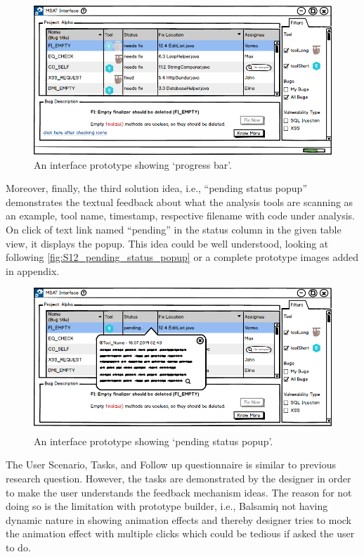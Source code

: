 \begin{figure}[hbt!]
	\centering
	\includegraphics[width=\linewidth]{figures/solution_ideas_snaps/S12_disabled_icons_progress_bar}
	\caption{An interface prototype showing ‘progress bar’.}
	\label{fig:S12_disabled_icons_progress_bar}
\end{figure}


Moreover, finally, the third solution idea, i.e., “pending status popup” demonstrates the textual feedback about what the analysis tools are scanning as an example, tool name, timestamp, respective filename with code under analysis. On click of text link named “pending” in the status column in the given table view, it displays the popup. This idea could be well understood, looking at following \autoref{fig:S12_pending_status_popup} or a complete prototype images added in appendix. \\


\begin{figure}[hbt!]
	\centering
	\includegraphics[width=\linewidth]{figures/solution_ideas_snaps/S12_pending_status_popup}
	\caption{An interface prototype showing ‘pending status popup’.}
	\label{fig:S12_pending_status_popup}
\end{figure}

The User Scenario, Tasks, and Follow up questionnaire is similar to previous research question. However, the tasks are demonstrated by the designer in order to make the user understands the feedback mechanism ideas. The reason for not doing so is the limitation with prototype builder, i.e., Balsamiq not having dynamic nature in showing animation effects and thereby designer tries to mock the animation effect with multiple clicks which could be tedious if asked the user to do. \\

